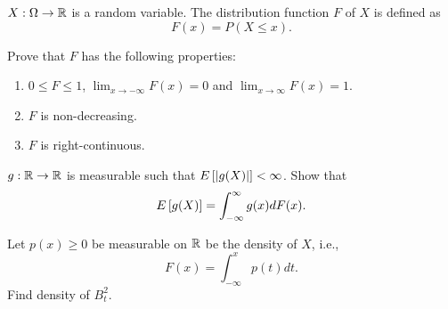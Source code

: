 \begin{exercise}{2.2}
    $X:\Omega\to\mathbb{R}$ is a random variable. The distribution function $F$ of $X$ is 
    defined as 
    \begin{equation*}
        F(x) = P(X\leq x). 
    \end{equation*}
    \begin{thmenum}
        \item Prove that $F$ has the following properties:
        \begin{enumerate}[label=(\roman*)]
            \item $0\leq F\leq 1$, $\lim_{x\to-\infty} F(x) = 0$ and $\lim_{x\to\infty} F(x) = 1$.
            \item $F$ is non-decreasing. 
            \item $F$ is right-continuous. 
        \end{enumerate}
        \item $g:\mathbb{R}\to\mathbb{R}$ is measurable such that $E\left[ {\left\lvert {g(X)} \right\rvert} \right] < \infty$. Show 
        that 
        \begin{equation*}
            E\left[ {g(X)} \right] = \int_{-\infty}^\infty g(x) dF(x).
        \end{equation*}
        \item Let $p(x)\geq 0$ be measurable on $\mathbb{R}$ be the density of $X$, i.e., 
        \begin{equation*}
            F(x) = \int_{-\infty}^x p(t) dt.
        \end{equation*}
        Find density of $B_t^2$. 
    \end{thmenum}
\end{exercise}
